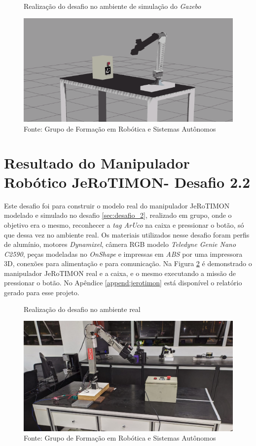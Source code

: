 \begin{figure}[H]
    \caption{Realização do desafio no ambiente de simulação do \textit{Gazebo}}
    \centering
    \includegraphics[width= \textwidth]{Figures/manipulador_simulacao.png}
    \caption*{Fonte: Grupo de Formação em Robótica e Sistemas Autônomos}
    \label{fig:manipulador_simulacao}
\end{figure}



\section{Resultado do Manipulador Robótico JeRoTIMON- Desafio 2.2 }
\label{sec:desafio_2_2}
Este desafio foi para construir o modelo real do manipulador JeRoTIMON modelado e simulado no desafio \ref{sec:desafio_2}, realizado em grupo, onde o objetivo era o mesmo, reconhecer a \textit{tag ArUco} na caixa e pressionar o botão, só que dessa vez no ambiente real. Os materiais utilizados nesse desafio foram perfis de alumínio, motores \textit{Dynamixel}, câmera RGB modelo \textit{Teledyne Genie Nano C2590},  peças modeladas no \textit{OnShape} e impressas em \textit{ABS} por uma impressora 3D, conexões para alimentação e para comunicação.
Na Figura \ref{fig:manipulador_real} é demonstrado o manipulador JeRoTIMON real e a caixa, e o mesmo executando a missão de pressionar o botão. No Apêndice \ref{append:jerotimon} está disponível o relatório gerado para esse projeto.



\begin{figure}[H]
    \caption{Realização do desafio no ambiente real}
    \centering
    \includegraphics[width= \textwidth]{Figures/manipulador_real.png}
    \caption*{Fonte: Grupo de Formação em Robótica e Sistemas Autônomos}
    \label{fig:manipulador_real}
\end{figure}




